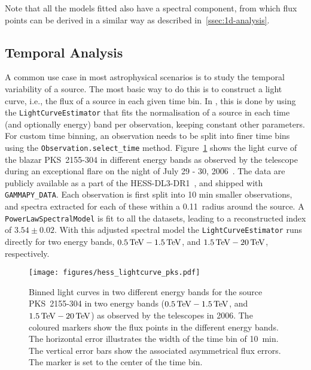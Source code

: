 \documentclass[traditabstract, longauth]{aa}
\newcommand{\todo}[1]{\textcolor{red}{TODO: #1}\PackageWarning{TODO:}{#1!}}
\newcommand{\code}[1]{\texttt{#1}}
\begin{document}
Note that all the models fitted also have a spectral component, from which flux
points can be derived in a similar way as described in~\ref{ssec:1d-analysis}.

\subsection{Temporal Analysis}
\label{ssec:temporal-analysis}
A common use case in most astrophysical scenarios is to study the temporal
variability of a source. The most basic way to do this is to construct a
light curve, i.e., the flux of a source in each given time bin. In \gammapy, this
is done by using the \code{LightCurveEstimator} that fits the normalisation of a
source in each time (and optionally energy) band per observation, keeping constant
other parameters.
For custom time binning, an observation needs to be split into finer time bins using
the \code{Observation.select\_time} method. Figure~\ref{fig:hess_lightcurve_pks}
shows the light curve of the blazar PKS~2155-304 in different energy bands as
observed by the \hess telescope during an exceptional flare on the night of
July 29 - 30, 2006~\cite{2009A&A...502..749A}. The data are publicly available 
as a part of the HESS-DL3-DR1~\cite{HESS-DL3-DR1}, and shipped with
\verb"GAMMAPY_DATA". Each observation is first split into 10 min smaller
observations, and spectra extracted for each of these within a 0.11\textdegree~radius
around the source. A \code{PowerLawSpectralModel} is fit to all the datasets, leading
to a reconstructed index of $3.54 \pm 0.02$. With this adjusted spectral model
the \code{LightCurveEstimator} runs directly for two energy bands, $0.5\,{\rm TeV} - 1.5\,{\rm TeV}$,
and $1.5\,{\rm TeV} - 20\,{\rm TeV}$, respectively.
%
\begin{figure*}[t]
    \sidecaption
	\texttt{[image: figures/hess\_lightcurve\_pks.pdf]}
	\caption{
        Binned light curves in two different energy bands for the source
        PKS~2155-304 in two energy bands ($0.5\,{\rm TeV} - 1.5\,{\rm TeV}$, and $1.5\,{\rm TeV} - 20\,{\rm TeV}$)
        as observed by the \hess telescopes in 2006. The coloured markers
        show the flux points in the different energy bands. The horizontal
        error illustrates the width of the time bin of 10~min. The vertical
        error bars show the associated asymmetrical flux errors. The marker
        is set to the center of the time bin.
    }
    \label{fig:hess_lightcurve_pks}
\end{figure*}
\end{document}
